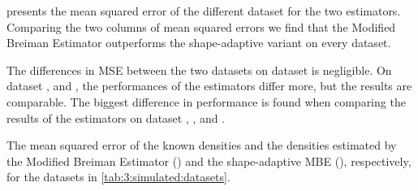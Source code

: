 
 presents the mean squared error of the different dataset for the two estimators. Comparing the two columns of mean squared errors we find that the Modified Breiman Estimator outperforms the shape-adaptive variant on every dataset. 

The differences in MSE between the two datasets on dataset \ferdosiOne is negligible. On dataset \ferdosiTwo, and \ferdosiFive, the performances of the estimators differ more, but the results are comparable. The biggest difference in performance is found when comparing the results of the estimators on dataset \baakmanOne, \baakmanFour, and \baakmanFive.

\begin{table}
	\centering
	
	\caption{The mean squared error of the known densities and the densities estimated by the Modified Breiman Estimator (\mbe) and the shape-adaptive MBE (\sambe), respectively, for the datasets in \cref{tab:3:simulated:datasets}.} 	
	\label{tab:4:results:mse}
\end{table}